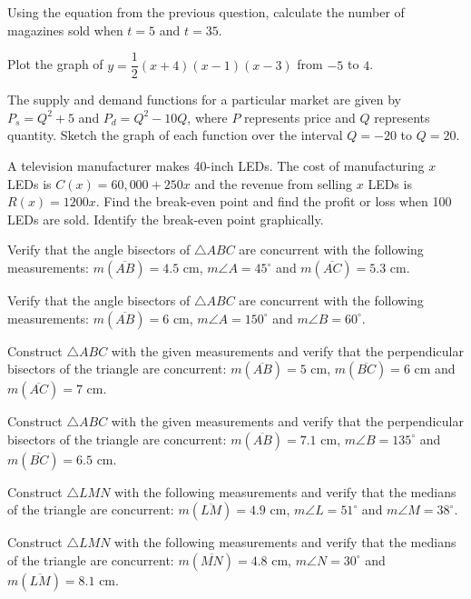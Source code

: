\documentclass[11pt]{article}
\newcommand{\seg}[1]{\overline{#1}}
\begin{document}
\begin{wq}[start=287]
\item Using the equation from the previous question, calculate the number of magazines sold when $t=5$ and $t=35$.

\item Plot the graph of $y=\dfrac{1}{2}(x+4)(x-1)(x-3)$ from $-5$ to $4$.

\item The supply and demand functions for a particular market are given by $P_s=Q^2+5$ and $P_d=Q^2-10Q$, where $P$ represents price and $Q$ represents quantity. Sketch the graph of each function over the interval $Q=-20$ to $Q=20$.

\item A television manufacturer makes 40-inch LEDs. The cost of manufacturing $x$ LEDs is $C(x)=60{,}000+250x$ and the revenue from selling $x$ LEDs is $R(x)=1200x$. Find the break-even point and find the profit or loss when 100 LEDs are sold. Identify the break-even point graphically.

\item Verify that the angle bisectors of $\triangle ABC$ are concurrent with the following measurements: $m(\seg{AB})=4.5$ cm, $m\angle A=45^{\circ}$ and $m(\seg{AC})=5.3$ cm.

\item Verify that the angle bisectors of $\triangle ABC$ are concurrent with the following measurements: $m(\seg{AB})=6$ cm, $m\angle A=150^{\circ}$ and $m\angle B=60^{\circ}$.

\item Construct $\triangle ABC$ with the given measurements and verify that the perpendicular bisectors of the triangle are concurrent: $m(\seg{AB})=5$ cm, $m(\seg{BC})=6$ cm and $m(\seg{AC})=7$ cm.

\item Construct $\triangle ABC$ with the given measurements and verify that the perpendicular bisectors of the triangle are concurrent: $m(\seg{AB})=7.1$ cm, $m\angle B=135^{\circ}$ and $m(\seg{BC})=6.5$ cm.

\item Construct $\triangle LMN$ with the following measurements and verify that the medians of the triangle are concurrent: $m(\seg{LM})=4.9$ cm, $m\angle L=51^{\circ}$ and $m\angle M=38^{\circ}$.

\item Construct $\triangle LMN$ with the following measurements and verify that the medians of the triangle are concurrent: $m(\seg{MN})=4.8$ cm, $m\angle N=30^{\circ}$ and $m(\seg{LM})=8.1$ cm.


\end{wq}
\end{document}
